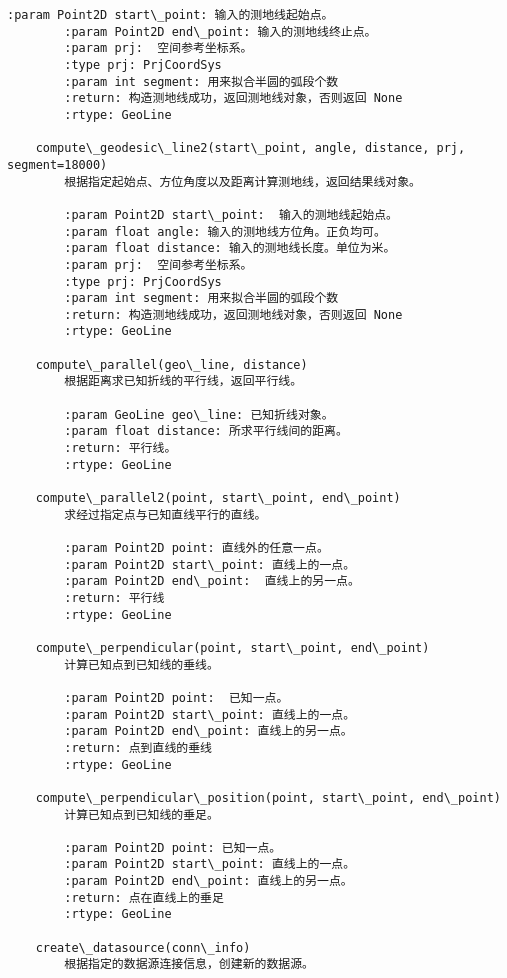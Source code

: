 \documentclass[11pt]{article}
\begin{document}
\begin{Verbatim}[commandchars=\\\{\}]
        :param Point2D start\_point: 输入的测地线起始点。
        :param Point2D end\_point: 输入的测地线终止点。
        :param prj:  空间参考坐标系。
        :type prj: PrjCoordSys
        :param int segment: 用来拟合半圆的弧段个数
        :return: 构造测地线成功，返回测地线对象，否则返回 None
        :rtype: GeoLine
    
    compute\_geodesic\_line2(start\_point, angle, distance, prj, segment=18000)
        根据指定起始点、方位角度以及距离计算测地线，返回结果线对象。
        
        :param Point2D start\_point:  输入的测地线起始点。
        :param float angle: 输入的测地线方位角。正负均可。
        :param float distance: 输入的测地线长度。单位为米。
        :param prj:  空间参考坐标系。
        :type prj: PrjCoordSys
        :param int segment: 用来拟合半圆的弧段个数
        :return: 构造测地线成功，返回测地线对象，否则返回 None
        :rtype: GeoLine
    
    compute\_parallel(geo\_line, distance)
        根据距离求已知折线的平行线，返回平行线。
        
        :param GeoLine geo\_line: 已知折线对象。
        :param float distance: 所求平行线间的距离。
        :return: 平行线。
        :rtype: GeoLine
    
    compute\_parallel2(point, start\_point, end\_point)
        求经过指定点与已知直线平行的直线。
        
        :param Point2D point: 直线外的任意一点。
        :param Point2D start\_point: 直线上的一点。
        :param Point2D end\_point:  直线上的另一点。
        :return: 平行线
        :rtype: GeoLine
    
    compute\_perpendicular(point, start\_point, end\_point)
        计算已知点到已知线的垂线。
        
        :param Point2D point:  已知一点。
        :param Point2D start\_point: 直线上的一点。
        :param Point2D end\_point: 直线上的另一点。
        :return: 点到直线的垂线
        :rtype: GeoLine
    
    compute\_perpendicular\_position(point, start\_point, end\_point)
        计算已知点到已知线的垂足。
        
        :param Point2D point: 已知一点。
        :param Point2D start\_point: 直线上的一点。
        :param Point2D end\_point: 直线上的另一点。
        :return: 点在直线上的垂足
        :rtype: GeoLine
    
    create\_datasource(conn\_info)
        根据指定的数据源连接信息，创建新的数据源。
        

\end{Verbatim}
\end{document}
